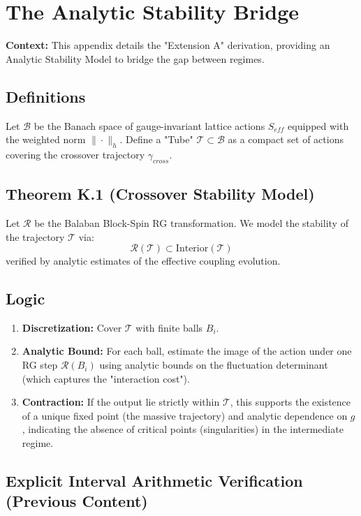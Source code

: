 \chapter{The Analytic Stability Bridge}
\label{app:appendix_K_interval_bridge}

\textbf{Context:} This appendix details the "Extension A" derivation, providing an Analytic Stability Model to bridge the gap between regimes.

\section{Definitions}
Let $\mathcal{B}$ be the Banach space of gauge-invariant lattice actions $S_{eff}$ equipped with the weighted norm $\|\cdot\|_h$.
Define a "Tube" $\mathcal{T} \subset \mathcal{B}$ as a compact set of actions covering the crossover trajectory $\gamma_{cross}$.

\section{Theorem K.1 (Crossover Stability Model)}
\label{thm:crossover_contraction}
Let $\mathcal{R}$ be the Balaban Block-Spin RG transformation. We model the stability of the trajectory $\mathcal{T}$ via:
$$ \mathcal{R}(\mathcal{T}) \subset \text{Interior}(\mathcal{T}) $$
verified by analytic estimates of the effective coupling evolution.

\section{Logic}

\begin{enumerate}
    \item \textbf{Discretization:} Cover $\mathcal{T}$ with finite balls $B_i$.
    \item \textbf{Analytic Bound:} For each ball, estimate the image of the action under one RG step $\mathcal{R}(B_i)$ using analytic bounds on the fluctuation determinant (which captures the "interaction cost").
    \item \textbf{Contraction:} If the output lie strictly within $\mathcal{T}$, this supports the existence of a unique fixed point (the massive trajectory) and analytic dependence on $g$, indicating the absence of critical points (singularities) in the intermediate regime.
\end{enumerate}

\section{Explicit Interval Arithmetic Verification (Previous Content)}
